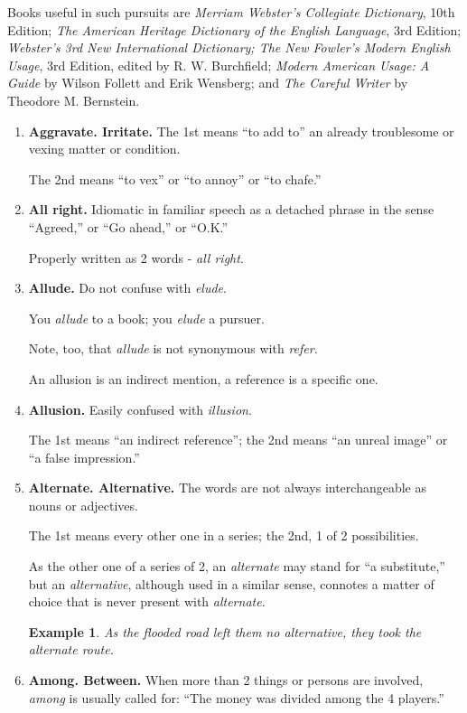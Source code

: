 \documentclass{article}
\newtheorem{example}{Example}
\begin{document}
Books useful in such pursuits are {\it Merriam Webster's Collegiate Dictionary}, 10th Edition; {\it The American Heritage Dictionary of the English Language}, 3rd Edition; {\it Webster's 3rd New International Dictionary; The New Fowler's Modern English Usage}, 3rd Edition, edited by R. W. Burchfield; {\it Modern American Usage: A Guide} by Wilson Follett and Erik Wensberg; and {\it The Careful Writer} by Theodore M. Bernstein.
\begin{enumerate}
	\item {\bf Aggravate. Irritate.} The 1st means ``to add to'' an already troublesome or vexing matter or condition.
	
	The 2nd means ``to vex'' or ``to annoy'' or ``to chafe.''
	\item {\bf All right.} Idiomatic in familiar speech as a detached phrase in the sense ``Agreed,'' or ``Go ahead,'' or ``O.K.''
	
	Properly written as 2 words - {\it all right}.
	\item {\bf Allude.} Do not confuse with {\it elude}.
	
	You {\it allude} to a book; you {\it elude} a pursuer.
	
	Note, too, that {\it allude} is not synonymous with {\it refer}.
	
	An allusion is an indirect mention, a reference is a specific one.
	\item {\bf Allusion.} Easily confused with {\it illusion}.
	
	The 1st means ``an indirect reference''; the 2nd means ``an unreal image'' or ``a false impression.''
	\item {\bf Alternate. Alternative.} The words are not always interchangeable as nouns or adjectives.
	
	The 1st means every other one in a series; the 2nd, 1 of 2 possibilities.
	
	As the other one of a series of 2, an {\it alternate} may stand for ``a substitute,'' but an {\it alternative}, although used in a similar sense, connotes a matter of choice that is never present with {\it alternate}.
	\begin{example}
		As the flooded road left them no alternative, they took the alternate route.
	\end{example}
	\item {\bf Among. Between.} When more than 2 things or persons are involved, {\it among} is usually called for: ``The money was divided among the 4 players.''
	

\end{enumerate}
\end{document}
